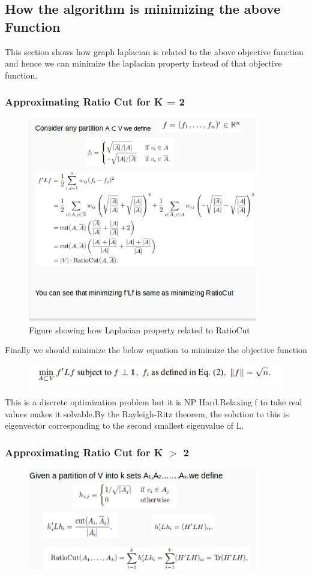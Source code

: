 \subsection{How the algorithm is minimizing the above Function }
This section shows how graph laplacian is related to the above objective function and hence we can minimize the laplacian property instead of that objective function.

\subsubsection{Approximating Ratio Cut for K = 2}
\begin{figure} [!htbp]
\centering
\includegraphics[width=100mm]{Pictures/k=2.png}
\caption{Figure showing how Laplacian property related to RatioCut}
\end{figure}

Finally we should minimize the below equation to minimize the objective function
\begin{figure} [!htbp]
\centering
\includegraphics[width=120mm]{Pictures/minim.png}
\end{figure}

This is a discrete optimization problem but it is NP Hard.Relaxing f to take real values makes it solvable.By the Rayleigh-Ritz theorem, 
the solution to this is eigenvector corresponding to the second smallest eigenvalue of L.
\subsubsection{Approximating Ratio Cut for K \texorpdfstring{$>$}{Lg} 2}
\begin{figure}[H]
\centering
\includegraphics[width=100mm]{Pictures/k>2_half.png}
\end{figure}

